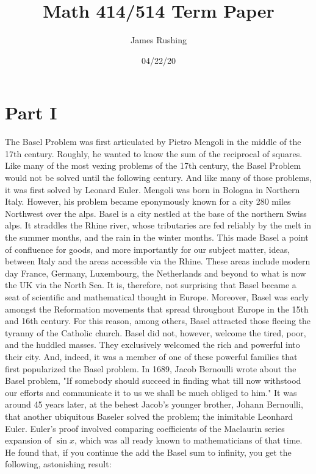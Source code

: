 \documentclass[12pt,oneside]{amsart}
\title{Math 414/514 Term Paper}
\author{James Rushing}
\date{04/22/20}
\theoremstyle{definition}
\theoremstyle{remark}
\numberwithin{equation}{exer}
\begin{document}
\maketitle
\section*{Part I}
\indent The Basel Problem was first articulated by Pietro Mengoli in the middle of the 17th century. Roughly, he wanted to know the sum of the reciprocal of squares.  Like many of the most vexing problems of the 17th century, the Basel Problem would not be solved until the following century. And like many of those problems, it was first solved by Leonard Euler.  
\newline
\indent Mengoli was born in Bologna in Northern Italy. However, his problem became eponymously known for a city 280 miles Northwest over the alps. Basel is a city nestled at the base of the northern Swiss alps. It straddles the Rhine river, whose tributaries are fed reliably by the melt in the summer months, and the rain in the winter months. This made Basel a point of confluence for goods, and more importantly for our subject matter, ideas, between Italy and the areas accessible via the Rhine. These areas include modern day France, Germany, Luxembourg, the Netherlands and beyond to what is now the UK via the North Sea\cite{basel}. 
\newline
\indent It is, therefore, not surprising that Basel became a seat of scientific and mathematical thought in Europe. Moreover, Basel was early amongst the Reformation movements that spread throughout Europe in the 15th and 16th century. For this reason, among others, Basel attracted those fleeing the tyranny of the Catholic church. Basel did not, however, welcome the tired, poor, and the huddled masses. They exclusively welcomed the rich and powerful into their city. And, indeed, it was a member of one of these powerful families that first popularized the Basel problem. In 1689, Jacob Bernoulli wrote about the Basel problem, "If somebody  should succeed in finding what till now withstood our efforts and communicate it to us we shall be much obliged to him." \cite{MR2422949}
\newline \indent
It was around 45 years later, at the behest Jacob's younger brother, Johann Bernoulli, that another ubiquitous Baseler solved the problem; the inimitable Leonhard Euler. Euler's proof involved comparing coefficients of the Maclaurin series expansion of $\sin{x}$, which was all ready known to mathematicians of that time. He found that, if you continue the add the Basel sum to infinity, you get the following, astonishing result:
\end{document}
